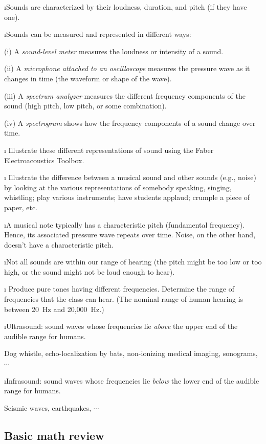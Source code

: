 \i Sounds are characterized by their loudness, 
duration, and pitch (if they have one).

\i Sounds can be measured and represented in
different ways:

(i) A {\em sound-level meter} measures the loudness or
intensity of a sound.

(ii) A {\em microphone attached to an oscilloscope} 
measures the pressure wave as
it changes in time (the waveform or shape of the wave).

(iii) A {\em spectrum analyzer} measures the different 
frequency components of the sound (high pitch, low pitch, 
or some combination).

(iv) A {\em spectrogram} shows how the frequency 
components of a sound change over time.

\i \demo 
Illustrate these different representations of sound using 
the Faber Electroacoustics Toolbox.

\i \demo
Illustrate the difference between a musical sound and
other sounds (e.g., noise) by looking at the various
representations of somebody speaking, singing, whistling;
play various instruments; have students applaud; crumple
a piece of paper, etc.

\i A musical note typically has a characteristic pitch
(fundamental frequency).
Hence, its associated pressure wave repeats over time.
Noise, on the other hand, doesn't have a characteristic pitch.

\i Not all sounds are within our range of hearing 
(the pitch might be too low or too high, or the 
sound might not be loud enough to hear).

\i \demo
Produce pure tones having different frequencies. 
Determine the range of frequencies that the class can
hear.
(The nominal range of human hearing is between 20~Hz and 
20,000~Hz.)

\i Ultrasound: sound waves whose frequencies lie {\em above}
the upper end of the audible range for humans.

\ex Dog whistle, echo-localization by bats,
non-ionizing medical imaging, sonograms, $\cdots$

\i Infrasound: sound waves whose frequencies lie {\em below}
the lower end of the audible range for humans.

\ex Seismic waves, earthquakes, $\cdots$

\ei
\subsection{Basic math review}

